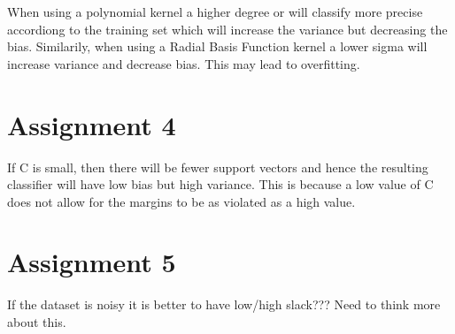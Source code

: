 \documentclass{article}
\begin{document}
When using a polynomial kernel a higher degree or will classify more precise accordiong to the training set which will increase 
the variance but decreasing the bias. 
Similarily, when using a Radial Basis Function kernel a lower sigma will increase variance and decrease bias. 
This may lead to overfitting. 

\section*{Assignment 4}

If C is small, then there will be fewer support vectors and hence the resulting classifier will have low bias but
high variance. This is because a low value of C does not allow for the margins to be as violated as a high value. 

\section*{Assignment 5}

If the dataset is noisy it is better to have low/high slack??? Need to think more about this. 
\end{document}
